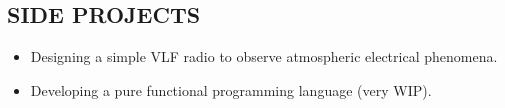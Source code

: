 \documentclass[letterpaper]{res}
\begin{document}
\begin{resume}


  \section{SIDE PROJECTS}
  \begin{itemize}
    \item Designing a simple VLF radio to observe atmospheric electrical phenomena.
    \item Developing a pure functional programming language (very WIP).
  \end{itemize}


\end{resume}
\end{document}
